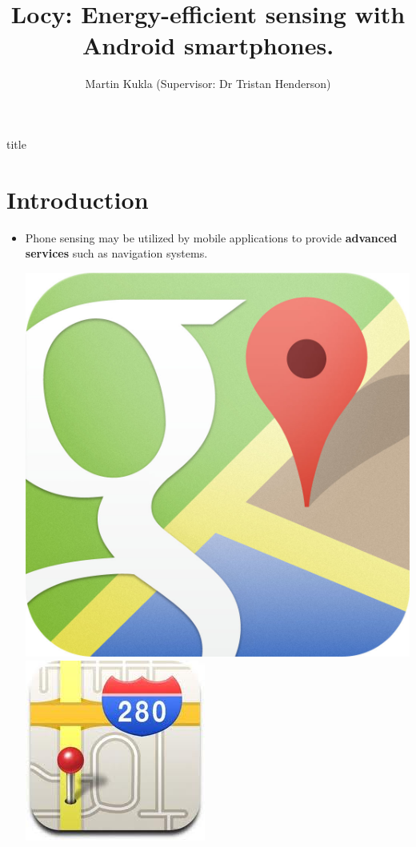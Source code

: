\documentclass[a2,landscape]{a0poster}
\title{Locy: Energy-efficient sensing with Android smartphones.}
\author{Martin Kukla (Supervisor: Dr Tristan Henderson)}
\date{}
\begin{document}
\begin{staticcontents*}{title}
\maketitle	 
\end{staticcontents*}
\thispagestyle{empty}
\section*{Introduction}
		
\begin{itemize}
   \item Phone sensing may be utilized by mobile applications to provide \textbf{advanced services} such as navigation systems.
   
   \includegraphics[scale=0.08]{plots/logo_google_maps}
	\includegraphics[scale=0.35]{plots/logo_apple_maps}

\end{itemize}
\end{document}

